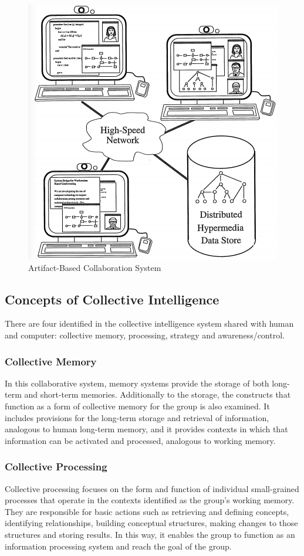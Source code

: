 \begin{figure}[!h]
\centering
\includegraphics[width=0.9\columnwidth]{figure/ABC}
\caption{Artifact-Based Collaboration System}
\label{fig:ABC}
\end{figure}

\subsection{Concepts of Collective Intelligence}
There are four identified in the collective intelligence system shared with human and computer: collective memory, processing, strategy and awareness/control.

\subsubsection{Collective Memory}
In this collaborative system, memory systems provide the storage of both long-term and short-term memories. Additionally to the storage, the constructs that function as a form of collective memory for the group is also examined. It includes provisions for the long-term storage and retrieval of information, analogous to human long-term memory, and it provides contexts in which that information can be activated and processed, analogous to working memory. 

\subsubsection{Collective Processing}
Collective processing focuses on the form and function of individual small-grained processes that operate in the contexts identified as the group's working memory. They are responsible for basic actions such as retrieving and defining concepts, identifying relationships, building conceptual structures, making changes to those structures and storing results. In this way, it enables the group to function as an information processing system and reach the goal of the group.

